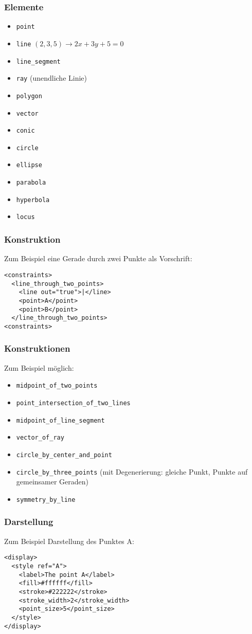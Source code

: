 \documentclass[11pt]{beamer}
\begin{document}
\begin{frame}
	\frametitle{Elemente}
	\begin{itemize}
		\item \texttt{point}
		\item \texttt{line} $(2,3,5)\to 2x+3y+5=0$
		\item \texttt{line\_segment}
		\item \texttt{ray} (unendliche Linie)
		\item \texttt{polygon}
		\item \texttt{vector}
		\item \texttt{conic}
		\item \texttt{circle}
		\item \texttt{ellipse}
		\item \texttt{parabola}
		\item \texttt{hyperbola}
		\item \texttt{locus}
	\end{itemize}
\end{frame}


	\begin{frame}[fragile]
		\frametitle{Konstruktion}
		Zum Beispiel eine Gerade durch zwei Punkte als Vorschrift:
		\begin{lstlisting}
<constraints>
  <line_through_two_points>
    <line out="true">|</line>
    <point>A</point>
    <point>B</point>
  </line_through_two_points>
<constraints>
		\end{lstlisting}
	\end{frame}

\begin{frame}
	\frametitle{Konstruktionen}
	Zum Beispiel möglich:
	\begin{itemize}
		\item \texttt{midpoint\_of\_two\_points}
		\item \texttt{point\_intersection\_of\_two\_lines}
		\item \texttt{midpoint\_of\_line\_segment}
		\item \texttt{vector\_of\_ray}
		\item \texttt{circle\_by\_center\_and\_point}
		\item \texttt{circle\_by\_three\_points} (mit Degenerierung: gleiche Punkt, Punkte auf gemeinsamer Geraden)
		\item \texttt{symmetry\_by\_line}
	\end{itemize}
\end{frame}

	\begin{frame}[fragile]
		\frametitle{Darstellung}
		Zum Beispiel Darstellung des Punktes A:
		\begin{lstlisting}
<display>
  <style ref="A">
    <label>The point A</label>
    <fill>#ffffff</fill>
    <stroke>#222222</stroke>
    <stroke_width>2</stroke_width>
    <point_size>5</point_size>
  </style>
</display>
		\end{lstlisting}
\end{frame}
\end{document}
